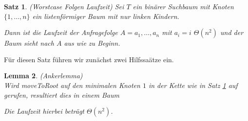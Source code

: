 \documentclass[11pt,a4paper,ngerman]{article}
\newtheorem{propo}{Satz}
\newtheorem{lemmas}[propo]{Lemma}
\begin{document}
\begin{propo}\label{ads:ueb2:mtrheu} (Worstcase Folgen Laufzeit)
   Sei $T$ ein binärer Suchbaum mit Knoten $\{1, \ldots, n\}$ 
   ein listenförmiger Baum mit nur linken Kindern. 

   \begin{center}
   \end{center}

   Dann 
   ist die Laufzeit der Anfragefolge $A = a_1, \ldots, a_n$ mit 
   $a_i = i$ $\Theta(n^2)$ und der Baum sieht nach $A$ aus wie zu Beginn.
\end{propo}

Für diesen Satz führen wir zunächst zwei Hilfssaätze ein.

\begin{lemmas} \label{ads:ueb2:lemma1} (Ankerlemma)\\
   Wird \emph{moveToRoot} auf den minimalen Knoten $1$ in der Kette wie in Satz \ref{ads:ueb2:mtrheu} auf gerufen, resultiert dies in einem Baum

   \begin{center}
   \end{center}

   Die Laufzeit hierbei beträgt $\Theta(n^2)$.
\end{lemmas}
\end{document}
